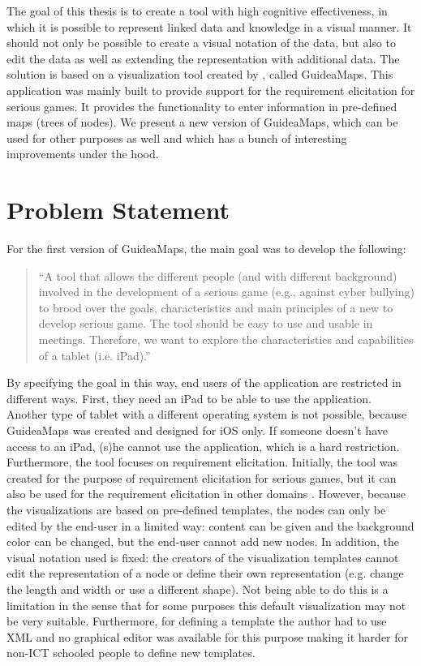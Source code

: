 The goal of this thesis is to create a tool with high cognitive effectiveness, in which it is possible to represent linked data and knowledge in a visual manner. It should not only be possible to create a visual notation of the data, but also to edit the data as well as extending the representation with additional data. The solution is based on a visualization tool created by \cite{erikjanssens}, called GuideaMaps. This application was mainly built to provide support for the requirement elicitation for serious games. It provides the functionality to enter information in pre-defined maps (trees of nodes). We present a new version of GuideaMaps, which can be used for other purposes as well and which has a bunch of interesting improvements under the hood.

\section{Problem Statement}\label{sec:problem-statement}
For the first version of GuideaMaps, the main goal was to develop the following:

\begin{quote}
``A tool that allows the different people (and with different background) involved in the development of a serious game (e.g., against cyber bullying) to brood over the goals, characteristics and main principles of a new to develop serious game. The tool should be easy to use and usable in meetings. Therefore, we want to explore the characteristics and capabilities of a tablet (i.e. iPad).'' \hfill \citep{erikjanssens}
\end{quote}

By specifying the goal in this way, end users of the application are restricted in different ways. First, they need an iPad to be able to use the application. Another type of tablet with a different operating system is not possible, because GuideaMaps was created and designed for iOS only. If someone doesn't have access to an iPad, (s)he cannot use the application, which is a hard restriction.\\

Furthermore, the tool focuses on requirement elicitation. Initially, the tool was created for the purpose of requirement elicitation for serious games, but it can also be used for the requirement elicitation in other domains \citep{detroyerjanssens}. However, because the visualizations are based on pre-defined templates, the nodes can only be edited by the end-user in a limited way: content can be given and the background color can be changed, but the end-user cannot add new nodes. In addition, the visual notation used is fixed: the creators of the visualization templates cannot edit the representation of a node or define their own representation (e.g. change the length and width or use a different shape). Not being able to do this is a limitation in the sense that for some purposes this default visualization may not be very suitable. Furthermore, for defining a template the author had to use XML and no graphical editor was available for this purpose making it harder for non-ICT schooled people to define new templates.

